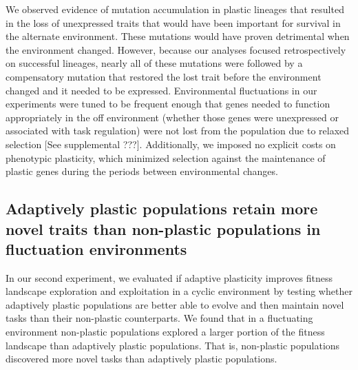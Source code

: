 We observed evidence of mutation accumulation in plastic lineages that resulted in the loss of unexpressed traits that would have been important for survival in the alternate environment.
These mutations would have proven detrimental when the environment changed.
However, because our analyses focused retrospectively on successful lineages, nearly all of these mutations were followed by a compensatory mutation that restored the lost trait before the environment changed and it needed to be expressed.
Environmental fluctuations in our experiments were tuned to be frequent enough that genes needed to function appropriately in the off environment (whether those genes were unexpressed or associated with task regulation) were not lost from the population due to relaxed selection [See supplemental ???].
Additionally, we imposed no explicit costs on phenotypic plasticity, which minimized selection against the maintenance of plastic genes during the periods between environmental changes.  

\vspace{0.25cm}
\subsection{Adaptively plastic populations retain more novel traits than non-plastic populations in fluctuation environments}

In our second experiment, we evaluated if adaptive plasticity improves fitness landscape exploration and exploitation in a cyclic environment by testing whether adaptively plastic populations are better able to evolve and then maintain novel tasks than their non-plastic counterparts.
We found that in a fluctuating environment non-plastic populations explored a larger portion of the fitness landscape than adaptively plastic populations.
That is, non-plastic populations discovered more novel tasks than adaptively plastic populations.

